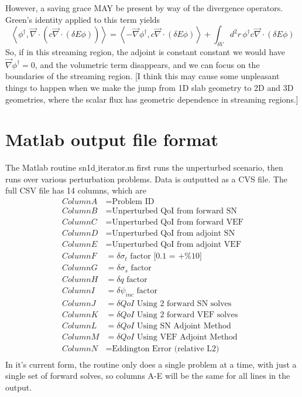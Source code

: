 \documentclass{article}
\newcommand{\bra}{\left\langle}
\newcommand{\ket}{\right\rangle}
\newcommand{\vdiv}{\vec{\nabla} \cdot}
\newcommand{\vgrad}{\vec{\nabla}}
\begin{document}
However, a saving grace MAY be present by way of the divergence operators. Green's identity applied to this term yields
\[
\bra \phi^\dag , \vdiv \left( c \vdiv \left( \delta E \phi \right) \right)  \ket 
= 
\bra -\vgrad \phi^\dag , c \vdiv \left( \delta E \phi \right)  \ket + \int_{\delta V} d^2 r \, \phi^\dag  c \vdiv \left( \delta E \phi \right)
\]
So, if in this streaming region, the adjoint is constant constant we would have $\vgrad \phi^\dag =0$, and the volumetric term disappears, and we can focus on the boundaries of the streaming region. [I think this may cause some unpleasant things to happen when we make the jump from 1D slab geometry to 2D and 3D geometries, where the scalar flux has geometric dependence in streaming regions.]


\section{Matlab output file format}
The Matlab routine sn1d$\_$iterator.m first runs the unperturbed scenario, then runs over various perturbation problems. Data is outputted as a CVS file. The full CSV file has 14 columns, which are
\begin{align*}
Column A &= \text{Problem ID} \\
Column B &= \text{Unperturbed QoI from forward SN} \\
Column C &= \text{Unperturbed QoI from forward VEF} \\
Column D &= \text{Unperturbed QoI from adjoint SN}  \\
Column E &= \text{Unperturbed QoI from adjoint VEF}  \\
Column F &= \delta \sigma_t\text{ factor [0.1 = +\%10]} \\
Column G &= \delta \sigma_s\text{ factor} \\
Column H &= \delta q\text{ factor}  \\
Column I &= \delta \psi_{inc}\text{ factor} \\
Column J &= \delta QoI \text{ Using 2 forward SN solves} \\
Column K &= \delta QoI \text{ Using 2 forward VEF solves} \\
Column L &= \delta QoI \text{ Using SN Adjoint Method} \\
Column M &= \delta QoI \text{ Using VEF Adjoint Method}\\
Column N &= \text{Eddington Error (relative L2)} \\
\end{align*}
In it's current form, the routine only does a single problem at a time, with just a single set of forward solves, so columns A-E will be the same for all lines in the output.
\end{document}
